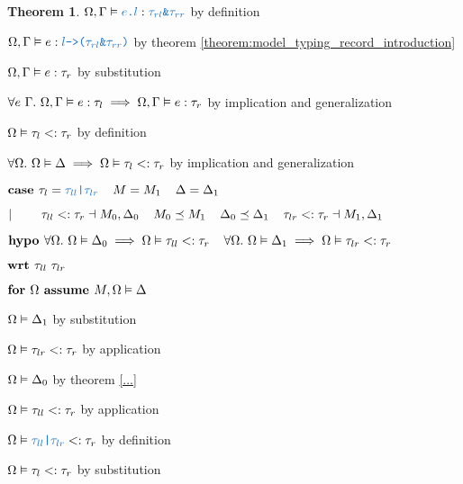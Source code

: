 \documentclass[acmsmall]{acmart}
\theoremstyle{definition}
\newtheorem{theorem}{Theorem}[section]
\begin{document}
\begin{theorem}
          \item \Z\Z\Z\Z $\Omega, \Gamma \satisfies \obj{$e$.$l$} \hastype \obj{$\tau_{rl}$\&$\tau_{rr}$}$ by definition
          \item \Z\Z\Z\Z $\Omega, \Gamma \satisfies e \hastype \obj{$l$->($\tau_{rl}$\&$\tau_{rr}$)}$ by theorem \ref{theorem:model_typing_record_introduction} 
          \item \Z\Z\Z\Z $\Omega, \Gamma \vDash e : \tau_r$ by substitution 
        \item \Z\Z\Z $\forall e\ \Gamma .\ \Omega, \Gamma \vDash e : \tau_l \implies 
          \Omega, \Gamma \vDash e : \tau_r
        $ by implication and generalization
        \item \Z\Z\Z $\Omega \vDash \tau_l <: \tau_r$
        by definition 
      \item \Z\Z $\forall \Omega .\ \Omega \vDash \Delta \implies \Omega \vDash \tau_l <: \tau_r$ 
      by implication and generalization 


    \item \Z $\B{case } 
      \tau_l = \obj{$\tau_{ll}$|$\tau_{lr}$}
      \I
      M = M_1
      \I
      \Delta = \Delta_1
    $
    \item \Z $|\ \ \ \ \ \ \ 
      \tau_{ll} <: \tau_r
      \dashv M_0, \Delta_0
      \hspace{4mm}
      M_0 \preceq M_1
      \hspace{4mm}
      \Delta_0 \preceq \Delta_1
      \hspace{4mm}
      \tau_{lr} <: \tau_r
      \dashv M_1, \Delta_1
    $

    \item \Z $\textbf{hypo } 
      \forall \Omega .\ \Omega \vDash \Delta_0 \implies \Omega \vDash \tau_{ll} <: \tau_r
      \hspace{4mm}
      \forall \Omega .\ \Omega \vDash \Delta_1 \implies \Omega \vDash \tau_{lr} <: \tau_r
    $
    \item \Z $\textbf{wrt } \tau_{ll}\ \tau_{lr}$

      \item \Z\Z $\textbf{for } \Omega \textbf{ assume } M, \Omega \vDash \Delta$
        \item \Z\Z\Z $\Omega \vDash \Delta_1$ by substitution 
        \item \Z\Z\Z $\Omega \vDash \tau_{lr} <: \tau_r$ by application 
        \item \Z\Z\Z $\Omega \vDash \Delta_0$ by theorem \ref{...}  
        \item \Z\Z\Z $\Omega \vDash \tau_{ll} <: \tau_r$ by application 
        \item \Z\Z\Z $\Omega \satisfies \obj{$\tau_{ll}$|$\tau_{lr}$} \subtypes \tau_r$ 
        by definition
        \item \Z\Z\Z $\Omega \vDash \tau_l <: \tau_r$ 
        by substitution 


\end{theorem}
\end{document}
